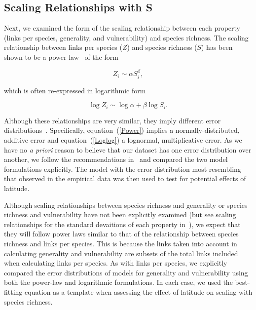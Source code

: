 \documentclass[12pt]{article}
\begin{document}
\subsection*{Scaling Relationships with S}

  Next, we examined the form of the scaling relationship between each 
  property (links per species, generality, and vulnerability) and 
  species richness. The scaling relationship between links per species ($Z$) and 
  species richness ($S$) has been shown to be a power law~\citep{Riede2010} of the form 

  \begin{equation}
  \label{Power}
  Z_{i} \sim \alpha S_{i}^{\beta}  ,
  \end{equation}

  \noindent which is often re-expressed in logarithmic form 

  \begin{equation}
  \label{Loglog}
  \log{Z_{i}} \sim \log{\alpha} + \beta\log{S_{i}}  .
  \end{equation}


  \noindent Although these relationships are very similar, they imply different error distributions~\citep{Xiao2011}.
  Specifically, equation~(\ref{Power}) implies a normally-distributed, additive error and equation~(\ref{Loglog}) a lognormal,
  multiplicative error. As we have no \emph{a priori} reason to believe that our dataset has one error distribution
  over another, we follow the recommendations in~\citet{Xiao2011} and compared the two
  model formulations explicitly. The model with the error distribution most resembling that observed in the empirical
  data was then used to test for potential effects of latitude.


  Although scaling relationships between species richness and generality or
  species richness and vulnerability have not been explicitly examined (but see scaling 
  relationships for the standard devaitions of each property in~\citet{Riede2010}), we expect that they will follow
  power laws similar to that of the relationship between species richness and links per species.
  This is because the links taken into account in calculating generality and vulnerability are subsets 
  of the total links included when calculating links per species. As with links per species, we explicitly 
  compared the error distributions of models for generality and vulnerability using
  both the power-law and logarithmic formulations. 
  In each case, we used the best-fitting equation as a template when assessing the effect of latitude on scaling with
  species richness.
\end{document}
